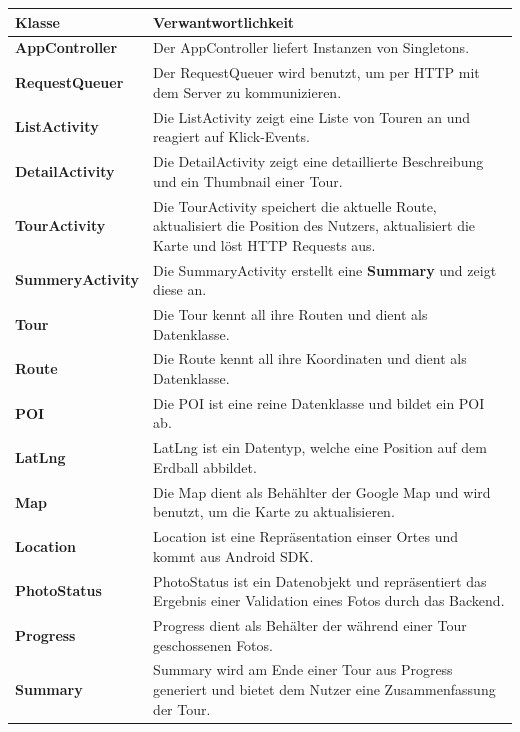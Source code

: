 \documentclass[a4paper,10pt,xetex]{article}
\begin{document}
\begin{longtabu} to \textwidth { | l | X[l] |  }
\hline
\textbf{Klasse} & \textbf{Verwantwortlichkeit}\\\hline
\endhead
\textbf{AppController} & Der AppController liefert Instanzen von Singletons.\\\hline
\textbf{RequestQueuer} & Der RequestQueuer wird benutzt, um per HTTP mit dem 
Server zu kommunizieren.\\\hline
\textbf{ListActivity} & Die ListActivity zeigt eine Liste von Touren an und 
reagiert auf Klick-Events.\\\hline
\textbf{DetailActivity} & Die DetailActivity zeigt eine detaillierte Beschreibung 
und ein Thumbnail einer Tour.\\\hline
\textbf{TourActivity} & Die TourActivity speichert die aktuelle Route, aktualisiert
die Position des Nutzers, aktualisiert die Karte und löst HTTP Requests aus.\\\hline
\textbf{SummeryActivity} & Die SummaryActivity erstellt eine \textbf{Summary} 
und zeigt diese an.\\\hline
\textbf{Tour} & Die Tour kennt all ihre Routen und dient als Datenklasse. \\\hline
\textbf{Route} & Die Route kennt all ihre Koordinaten und dient als 
Datenklasse. \\\hline
\textbf{POI} & Die POI ist eine reine Datenklasse und bildet ein POI ab.\\\hline
\textbf{LatLng} & LatLng ist ein Datentyp, welche eine Position auf dem
Erdball abbildet.\\\hline
\textbf{Map} & Die Map dient als Behählter der Google Map und wird benutzt, um
die Karte zu aktualisieren.\\\hline
\textbf{Location} & Location ist eine Repräsentation einser Ortes und kommt aus 
Android SDK.\\\hline
\textbf{PhotoStatus} & PhotoStatus ist ein Datenobjekt und repräsentiert das 
Ergebnis einer Validation eines Fotos durch das Backend.\\\hline
\textbf{Progress} & Progress dient als Behälter der während einer Tour geschossenen
Fotos.\\\hline
\textbf{Summary} & Summary wird am Ende einer Tour aus Progress generiert und
bietet dem Nutzer eine Zusammenfassung der Tour.\\\hline
\end{longtabu}
\end{document}
